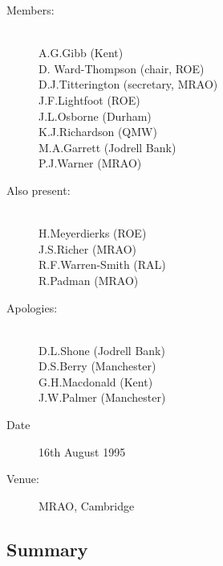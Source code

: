 \begin{description}
\item[Members:]\mbox{}\\
A.G.Gibb (Kent)\\
D. Ward-Thompson (chair, ROE)\\
D.J.Titterington (secretary, MRAO)\\
J.F.Lightfoot (ROE)\\
J.L.Osborne (Durham)\\
K.J.Richardson (QMW)\\
M.A.Garrett (Jodrell Bank)\\
P.J.Warner (MRAO)

\item[Also present:]\mbox{}\\
H.Meyerdierks (ROE)\\
J.S.Richer (MRAO)\\
R.F.Warren-Smith (RAL)\\
R.Padman (MRAO)

\item[Apologies:]\mbox{}\\
D.L.Shone (Jodrell Bank)\\
D.S.Berry (Manchester)\\
G.H.Macdonald (Kent)\\
J.W.Palmer (Manchester)

\item[Date]16th August 1995

\item[Venue:]MRAO, Cambridge
\end{description}

\subsection{Summary}

